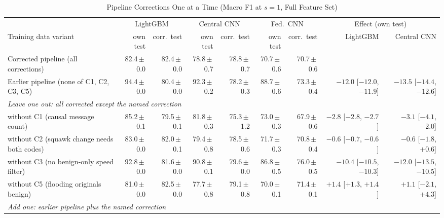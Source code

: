 \begin{table}[t]
\centering
\scriptsize
\caption{Pipeline Corrections One at a Time (Macro F1 at $s=1$, Full Feature Set)}
\label{tab:ablationcorrections}
\setlength{\tabcolsep}{3pt}
\begin{tabular}{lrrrrrrrr}
\toprule
& \multicolumn{2}{c}{LightGBM} & \multicolumn{2}{c}{Central CNN} & \multicolumn{2}{c}{Fed.\ CNN} & \multicolumn{2}{c}{Effect (own test)} \\
\cmidrule(lr){2-3}\cmidrule(lr){4-5}\cmidrule(lr){6-7}\cmidrule(lr){8-9}
Training data variant & own test & corr.\ test & own test & corr.\ test & own test & corr.\ test & LightGBM & Central CNN \\
\midrule
Corrected pipeline (all corrections) & 82.4{\,}$\pm${\,}0.0 & 82.4{\,}$\pm${\,}0.0 & 78.8{\,}$\pm${\,}0.7 & 78.8{\,}$\pm${\,}0.7 & 70.7{\,}$\pm${\,}0.6 & 70.7{\,}$\pm${\,}0.6 &  &  \\
Earlier pipeline (none of C1, C2, C3, C5) & 94.4{\,}$\pm${\,}0.0 & 80.4{\,}$\pm${\,}0.0 & 92.3{\,}$\pm${\,}0.2 & 78.2{\,}$\pm${\,}0.3 & 88.7{\,}$\pm${\,}0.6 & 73.3{\,}$\pm${\,}0.4 & $-12.0$ [$-12.0$, $-11.9$] & $-13.5$ [$-14.4$, $-12.6$] \\
\midrule
\multicolumn{9}{l}{\emph{Leave one out: all corrected except the named correction}} \\
\quad without C1 (causal message count) & 85.2{\,}$\pm${\,}0.1 & 79.5{\,}$\pm${\,}0.1 & 81.8{\,}$\pm${\,}0.3 & 75.3{\,}$\pm${\,}1.2 & 73.0{\,}$\pm${\,}0.3 & 67.9{\,}$\pm${\,}0.6 & $-2.8$ [$-2.8$, $-2.7$] & $-3.1$ [$-4.1$, $-2.0$] \\
\quad without C2 (squawk change needs both codes) & 83.0{\,}$\pm${\,}0.0 & 82.0{\,}$\pm${\,}0.1 & 79.4{\,}$\pm${\,}0.8 & 78.5{\,}$\pm${\,}0.6 & 71.7{\,}$\pm${\,}0.3 & 70.8{\,}$\pm${\,}0.4 & $-0.6$ [$-0.7$, $-0.6$] & $-0.6$ [$-1.8$, $+0.6$] \\
\quad without C3 (no benign-only speed filter) & 92.8{\,}$\pm${\,}0.0 & 81.6{\,}$\pm${\,}0.0 & 90.8{\,}$\pm${\,}0.1 & 79.6{\,}$\pm${\,}0.0 & 86.8{\,}$\pm${\,}0.5 & 76.0{\,}$\pm${\,}0.5 & $-10.4$ [$-10.5$, $-10.3$] & $-12.0$ [$-13.5$, $-10.5$] \\
\quad without C5 (flooding originals benign) & 81.0{\,}$\pm${\,}0.0 & 82.5{\,}$\pm${\,}0.0 & 77.7{\,}$\pm${\,}0.8 & 79.1{\,}$\pm${\,}0.8 & 70.0{\,}$\pm${\,}0.1 & 71.4{\,}$\pm${\,}0.1 & $+1.4$ [$+1.3$, $+1.4$] & $+1.1$ [$-2.1$, $+4.3$] \\
\midrule
\multicolumn{9}{l}{\emph{Add one: earlier pipeline plus the named correction}} \\

\end{tabular}
\end{table}
